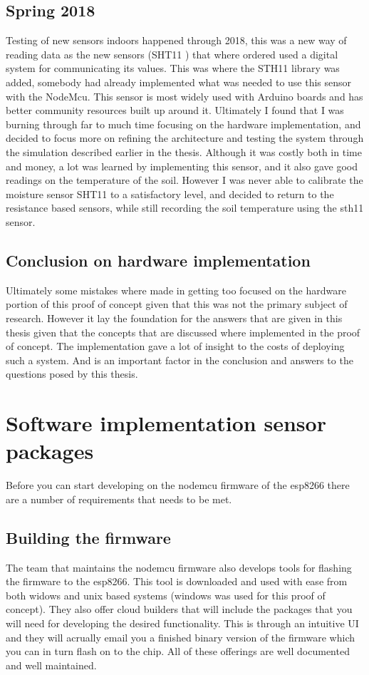 \documentclass[]{uiophd}
\begin{document}
\subsection{Spring 2018}
Testing of new sensors indoors happened through 2018, this was a new way of reading data as the new sensors (SHT11 \cite{sensorion}) that where ordered used a digital system for communicating its values. This was where the STH11 library was added, somebody had already implemented what was needed to use this sensor with the NodeMcu. This sensor is most widely used with Arduino boards and has better community resources built up around it. Ultimately I found that I was burning through far to much time focusing on the hardware implementation, and decided to focus more on refining the architecture and testing the system through the simulation described earlier in the thesis. Although it was costly both in time and money, a lot was learned by implementing this sensor, and it also gave good readings on the temperature of the soil. However I was never able to calibrate the moisture sensor SHT11 to a satisfactory level, and decided to return to the resistance based sensors, while still recording the soil temperature using the sth11 sensor. 
\subsection{Conclusion on hardware implementation}
Ultimately some mistakes where made in getting too focused on the hardware portion of this proof of concept given that this was not the primary subject of research. However it lay the foundation for the answers that are given in this thesis given that the concepts that are discussed where implemented in the proof of concept. The implementation gave a lot of insight to the costs of deploying such a system. And is an important factor in the conclusion and answers to the questions posed by this thesis.
\section{Software implementation sensor packages}
Before you can start developing on the nodemcu firmware of the esp8266 there are a number of requirements that needs to be met.
\subsection{Building the firmware}
The team that maintains the nodemcu firmware also develops tools for flashing the firmware to the esp8266. This tool is downloaded and used with ease from both widows and unix based systems (windows was used for this proof of concept). They also offer cloud builders that will include the packages that you will need for developing the desired functionality. This is through an intuitive UI and they will acrually email you a finished binary version of the firmware which you can in turn flash on to the chip. All of these offerings are well documented and well maintained.
\end{document}
